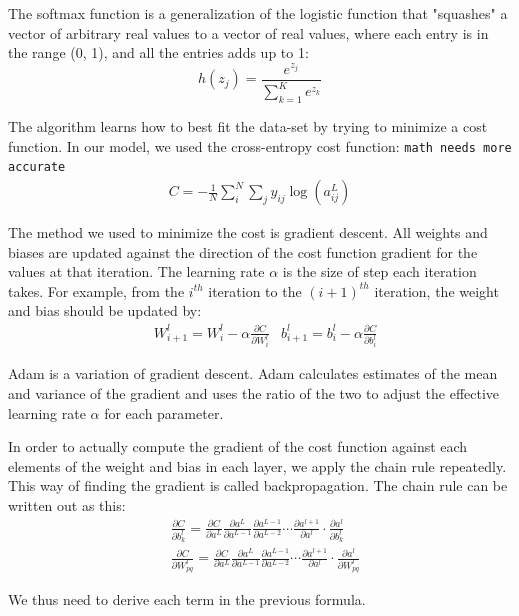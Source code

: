 \documentclass[11pt,letterpaper]{article}
\begin{document}
The softmax function is a generalization of the logistic function that "squashes" a vector of arbitrary real values to a vector of real values, where each entry is in the range (0, 1), and all the entries adds up to 1:
$$h(z_j)={\frac {e^{z_{j}}}{\sum _{k=1}^{K}e^{z_{k}}}}$$

The algorithm learns how to best fit the data-set by trying to minimize a cost function. In our model, we used the cross-entropy cost function: \texttt{math needs more accurate}
\begin{align}
C = - \frac{1}{N}\sum_i^N\sum_{j} y_{ij} \log (a^L_{ij})\label{eq:2}
\end{align}

The method we used to minimize the cost is gradient descent. All weights and biases are updated against the direction of the cost function gradient for the values at that iteration. The learning
rate $\alpha$ is the size of step each iteration takes. For example, from the $i^{th}$ iteration to the $(i+1)^{th}$ iteration, the weight and bias should be updated by:
\begin{align}
&W^l_{i+1}=W_i^l-\alpha\frac{\partial C}{\partial W^l_{i}} &b^l_{i+1}=b_i^l-\alpha\frac{\partial C}{\partial b^l_{i}}
\end{align}

Adam is a variation of gradient descent. Adam calculates estimates of the mean and variance of the gradient and uses the ratio of the two to adjust the effective learning rate $\alpha$ for each parameter\cite{adam}.

In order to actually compute the gradient of the cost function against each elements of the weight and bias in each layer, we apply the chain rule repeatedly. This way of finding the gradient is called backpropagation\cite{NNDL}. The chain rule can be written out as this:
\begin{align}
&\frac{\partial C}{\partial b_k^l} = \frac{\partial C}{\partial a^L}\frac{\partial a^L}{\partial a^{L-1}}\frac{\partial a^{L-1}}{\partial a^{L-2}}\cdots \frac{\partial a^{l+1}}{\partial a^{l}}\cdot \frac{\partial a^{l}}{\partial b_k^l} \label{eq:3}\\
&\frac{\partial C}{\partial W_{pq}^l} = \frac{\partial C}{\partial a^L}\frac{\partial a^L}{\partial a^{L-1}}\frac{\partial a^{L-1}}{\partial a^{L-2}}\cdots \frac{\partial a^{l+1}}{\partial a^{l}}\cdot \frac{\partial a^{l}}{\partial W_{pq}^l} \label{eq:4}
\end{align}

We thus need to derive each term in the previous formula.
\end{document}
